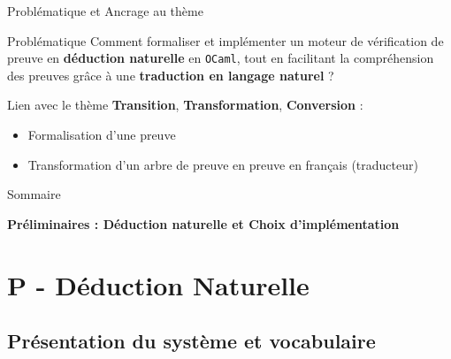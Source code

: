 \documentclass{beamer}
\begin{document}
\begin{frame}{Problématique et Ancrage au thème}
  \begin{block}{Problématique}
    Comment formaliser et implémenter un moteur de vérification de preuve en \textbf{déduction naturelle} en \texttt{OCaml}, tout en facilitant la compréhension des preuves grâce à une \textbf{traduction en langage naturel} ?
  \end{block}

    \vspace{0.8cm}

  \begin{block}{Lien avec le thème}
    \textbf{Transition}, \textbf{Transformation}, \textbf{Conversion} :
    \begin{itemize}
      \item Formalisation d'une preuve 
      \item Transformation d'un arbre de preuve en preuve en français (traducteur)
    \end{itemize}
  \end{block}
\end{frame}



\begin{frame}{Sommaire}
    \tableofcontents
\end{frame}


\begin{frame}
  \centering
  \vfill
  {\LARGE \textbf{ Préliminaires : Déduction naturelle et Choix d'implémentation}}
  \vfill
\end{frame}



\section{P - Déduction Naturelle}

\subsection{Présentation du système et vocabulaire}
\end{document}
